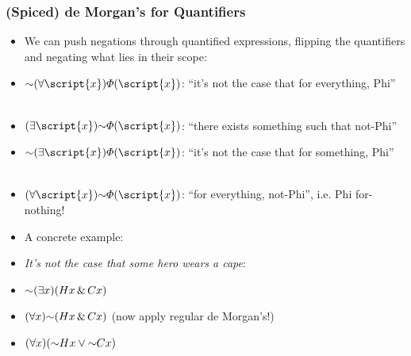 \begin{frame}
\frametitle{(Spiced) de Morgan's for Quantifiers}

\begin{itemize}[<+->]

\item We can push negations through quantified expressions, flipping the quantifiers and negating what lies in their scope:

\item $\enot \qt{\forall}{\script{x}}\metaA{}(\script{x})$: ``it's not the case that for everything, Phi'' \\  \\
\item [] $\qt{\exists}{\script{x}}\enot \metaA{}(\script{x})$: ``there exists something such that not-Phi''

\item $\enot \qt{\exists}{\script{x}}\metaA{}(\script{x})$: ``it's not the case that for something, Phi'' \\  \\
\item [] $\qt{\forall}{\script{x}}\enot \metaA{}(\script{x})$: ``for everything, not-Phi'', i.e. Phi for-nothing! 

\item[] A concrete example:

\item \textit{It's not the case that some hero wears a cape}:

\item[]  \alert{$\enot \qt{\exists}{x}(H\qv{x} \eand C\qv{x})$}

\item[] \alert{$\qt{\forall}{x}\enot (H\qv{x} \eand C\qv{x})$} (now apply regular de Morgan's!) 

\item[]\alert{$\qt{\forall}{x} (\enot H\qv{x} \eor \enot C\qv{x})$} 

\iffalse 
  \item \alert{Someone who wears a cape} welcomed Greta.\\
  \item[] \alert{$\qt{\exists}{x}(C\qv{x} \eand W\qr{x}{g})$}
  \item Greta admires \alert{some hero who wears a cape}.
  \item[] \alert{$\qt{\exists}{x}((H\qv{x} \eand C\qv{x}) \eand A\qr{g}{x})$}
  \item Autumn welcomed \alert{someone who welcomed Greta}.
  \item[] \alert{$\qt{\exists}{x}(W\qr{x}{g} \eand W\qr{a}{x})$}
\fi 

\end{itemize}
\end{frame}

